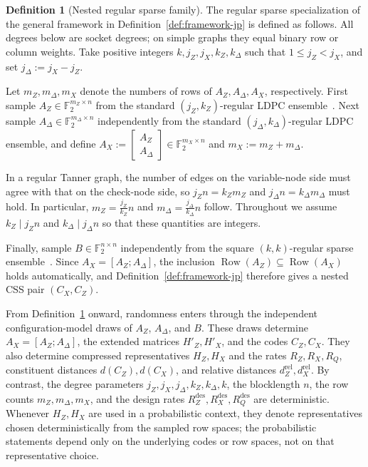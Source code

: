 \documentclass[11pt]{article}
\theoremstyle{definition}
\newtheorem{definition}[theorem]{Definition}
\newcommand{\F}{\mathbb F}
\newcommand{\Row}{\operatorname{Row}}
\newcommand{\CZ}{C_Z}
\newcommand{\CX}{C_X}
\begin{document}
\begin{definition}[Nested regular sparse family]\label{def:family-jp}
The regular sparse specialization of the general framework in Definition~\ref{def:framework-jp} is defined as follows. All degrees below are socket degrees; on simple graphs they equal binary row or column weights.
Take positive integers \(k,j_Z,j_X,k_Z,k_\Delta\) such that \(1\le j_Z<j_X\), and set
\(j_\Delta:=j_X-j_Z\).

Let \(m_Z,m_\Delta,m_X\) denote the numbers of rows of \(A_Z,A_\Delta,A_X\), respectively.
First sample \(A_Z\in\F_2^{m_Z\times n}\) from the standard \((j_Z,k_Z)\)-regular LDPC ensemble~\cite[Secs.~3.3--3.4]{RU08}.
Next sample \(A_\Delta\in\F_2^{m_\Delta\times n}\) independently from the standard \((j_\Delta,k_\Delta)\)-regular LDPC ensemble, and define \(A_X:=\begin{bmatrix}A_Z\\ A_\Delta\end{bmatrix}\in\F_2^{m_X\times n}\) and \(m_X:=m_Z+m_\Delta\).

In a regular Tanner graph, the number of edges on the variable-node side must agree with that on the check-node side, so
\(j_Z n = k_Z m_Z\) and \(j_\Delta n = k_\Delta m_\Delta\)
must hold. In particular,
\(m_Z=\frac{j_Z}{k_Z}n\) and \(m_\Delta=\frac{j_\Delta}{k_\Delta}n\)
follow. Throughout we assume \(k_Z\mid j_Z n\) and \(k_\Delta\mid j_\Delta n\) so that these quantities are integers.

Finally, sample \(B\in\F_2^{n\times n}\) independently from the square \((k,k)\)-regular sparse ensemble~\cite[Secs.~3.3--3.4]{RU08}.
Since \(A_X=[A_Z;A_\Delta]\), the inclusion \(\Row(A_Z)\subseteq \Row(A_X)\) holds automatically, and Definition~\ref{def:framework-jp} therefore gives a nested CSS pair \((\CX,\CZ)\).
\end{definition}

From Definition~\ref{def:family-jp} onward, randomness enters through the independent configuration-model draws of \(A_Z\), \(A_\Delta\), and \(B\). These draws determine \(A_X=[A_Z;A_\Delta]\), the extended matrices \(H'_Z,H'_X\), and the codes \(\CZ,\CX\). They also determine compressed representatives \(H_Z,H_X\) and the rates \(R_Z,R_X,R_Q\), constituent distances \(d(\CZ),d(\CX)\), and relative distances \(d_Z^{\mathrm{rel}},d_X^{\mathrm{rel}}\). By contrast, the degree parameters \(j_Z,j_X,j_\Delta,k_Z,k_\Delta,k\), the blocklength \(n\), the row counts \(m_Z,m_\Delta,m_X\), and the design rates \(R_Z^{\mathrm{des}},R_X^{\mathrm{des}},R_Q^{\mathrm{des}}\) are deterministic. Whenever \(H_Z,H_X\) are used in a probabilistic context, they denote representatives chosen deterministically from the sampled row spaces; the probabilistic statements depend only on the underlying codes or row spaces, not on that representative choice.
\end{document}

